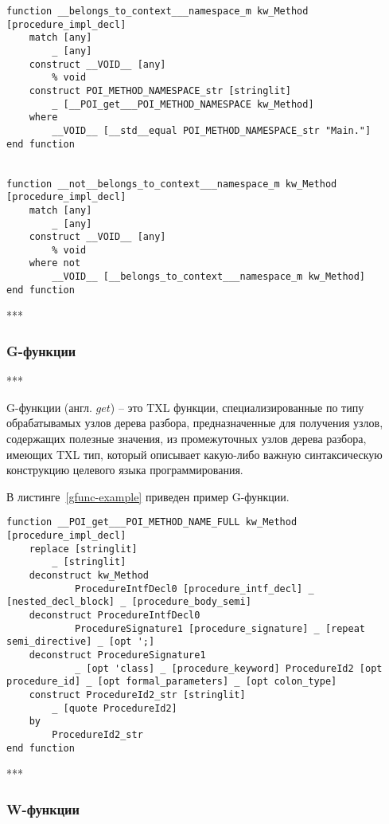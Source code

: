 \begin{lstlisting}[frame=single, language=TXL, label={hfunc-example}, caption={Пример H-функции}]
function __belongs_to_context___namespace_m kw_Method [procedure_impl_decl]
	match [any]
		_ [any]
	construct __VOID__ [any]
		% void
	construct POI_METHOD_NAMESPACE_str [stringlit]
		_ [__POI_get___POI_METHOD_NAMESPACE kw_Method]
	where
		__VOID__ [__std__equal POI_METHOD_NAMESPACE_str "Main."]
end function


function __not__belongs_to_context___namespace_m kw_Method [procedure_impl_decl]
	match [any]
		_ [any]
	construct __VOID__ [any]
		% void
	where not
		__VOID__ [__belongs_to_context___namespace_m kw_Method]
end function
\end{lstlisting}

***

\subsubsection{G-функции}

***

G-функции (англ. $get$) -- это TXL функции, специализированные по типу обрабатывамых узлов дерева разбора, предназначенные для получения узлов, содержащих полезные значения, из промежуточных узлов дерева разбора, имеющих TXL тип, который описывает какую-либо важную синтаксическую конструкцию целевого языка программирования.

В листинге~\ref{gfunc-example} приведен пример G-функции.

\begin{lstlisting}[frame=single, language=TXL, label={gfunc-example}, caption={Пример G-функции}]
function __POI_get___POI_METHOD_NAME_FULL kw_Method [procedure_impl_decl]
	replace [stringlit]
		_ [stringlit]
	deconstruct kw_Method
		    ProcedureIntfDecl0 [procedure_intf_decl] _ [nested_decl_block] _ [procedure_body_semi]
	deconstruct ProcedureIntfDecl0
		    ProcedureSignature1 [procedure_signature] _ [repeat semi_directive] _ [opt ';]
	deconstruct ProcedureSignature1
		    _ [opt 'class] _ [procedure_keyword] ProcedureId2 [opt procedure_id] _ [opt formal_parameters] _ [opt colon_type]
	construct ProcedureId2_str [stringlit]
		_ [quote ProcedureId2]
	by
		ProcedureId2_str
end function
\end{lstlisting}

***

\subsubsection{W-функции}


